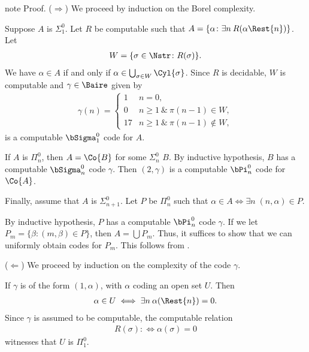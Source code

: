 \documentclass[letterpaper,10pt,english]{jupyterBook}
\begin{document}
\begin{sphinxadmonition}{note}
\sphinxAtStartPar
Proof. (\(\Rightarrow\)) We proceed by induction on the Borel complexity.

\sphinxAtStartPar
Suppose \(A\) is \(\Sigma^0_1\). Let \(R\) be computable such that \(A = \{ \alpha \colon \exists n \: R(\alpha\Rest{n})\}\). Let
\begin{equation*}
\begin{split}
    W = \{ \sigma \in \Nstr \colon R(\sigma)\}.
\end{split}
\end{equation*}
\sphinxAtStartPar
We have \(\alpha \in A\) if and only if \(\alpha \in \bigcup_{\sigma \in W} \Cyl{\sigma}\).
Since \(R\) is decidable, \(W\) is computable and \(\gamma \in \Baire\) given by
\begin{equation*}
\begin{split}
\gamma(n) = 
	\begin{cases}
		1 & n = 0, \\
		0 & n \geq 1 \: \& \: \pi(n-1) \in W,\\
		17 & n \geq 1 \: \& \: \pi(n-1) \notin W, 
	\end{cases}
\end{split}
\end{equation*}
\sphinxAtStartPar
is a computable \(\bSigma^0_1\) code for \(A\).

\sphinxAtStartPar
If \(A\) is \(\Pi^0_n\), then \(A = \Co{B}\) for some \(\Sigma^0_n\) \(B\). By inductive hypothesis, \(B\) has a computable \(\bSigma^0_n\) code \(\gamma\). Then \((2,\gamma)\) is a computable \(\bPi^0_n\) code for \(\Co{A}\).

\sphinxAtStartPar
Finally, assume that \(A\) is \(\Sigma^0_{n+1}\). Let \(P\) be \(\Pi^0_n\) such that \(\alpha \in A \iff \exists n \; (n,\alpha) \in P\).

\sphinxAtStartPar
By inductive hypothesis, \(P\) has a computable \(\bPi^0_n\) code \(\gamma\).
If we let \(P_m = \{\beta \colon (m,\beta) \in P\}\), then \(A = \bigcup P_m\). Thus, it suffices to show that we can uniformly obtain codes for \(P_m\). This follows from {\hyperref[\detokenize{codingBorel:lem-Borel-codes-shift}]{}}.

\sphinxAtStartPar
(\(\Leftarrow\)) We proceed by induction on the complexity of the code \(\gamma\).

\sphinxAtStartPar
If \(\gamma\) is of the form \((1,\alpha)\), with \(\alpha\) coding an open set \(U\). Then
\begin{equation*}
\begin{split}
\alpha \in U \iff \exists n \: \alpha(\Rest{n})= 0.
\end{split}
\end{equation*}
\sphinxAtStartPar
Since \(\gamma\) is assumed to be computable, the computable relation
\begin{equation*}
\begin{split}
R(\sigma) :\iff \alpha(\sigma) = 0
\end{split}
\end{equation*}
\sphinxAtStartPar
witnesses that \(U\) is \(\Pi^0_1\).


\end{sphinxadmonition}
\end{document}
